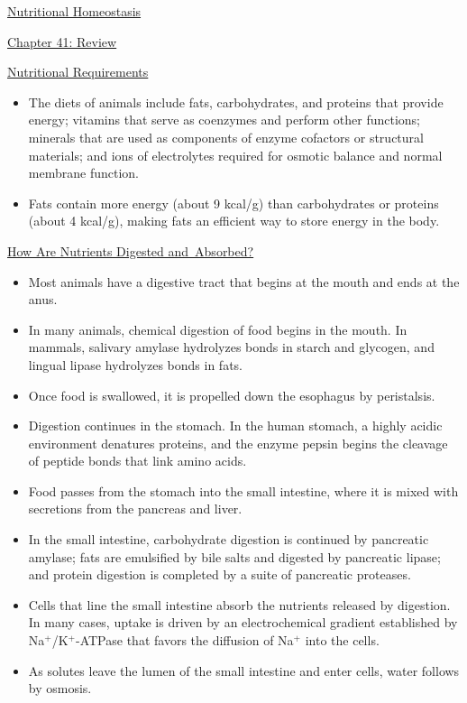 \documentclass[12pt,letterpaper]{article}
\begin{document}
\begin{secbox}{\hyperlink{41}{Nutritional Homeostasis}}
{\hypertarget{41.r}{}
\begin{probbox}{\hyperlink{41}{Chapter 41: Review}}\end{probbox}
    \hyperlink{41.1}{Nutritional Requirements}
    \begin{itemize}
        \item The diets of animals include fats, carbohydrates, and proteins that provide energy; vitamins that serve as coenzymes and perform other functions; minerals that are used as components of enzyme cofactors or structural materials; and ions of electrolytes required for osmotic balance and normal membrane function. 
        \item Fats contain more energy (about 9 kcal/g) than carbohydrates or proteins (about 4 kcal/g), making fats an efficient way to store energy in the body.
    \end{itemize}
    \hyperlink{41.3}{How Are Nutrients Digested and Absorbed?}
    \begin{itemize}
        \item Most animals have a digestive tract that begins at the mouth and ends at the anus. 
        \item In many animals, chemical digestion of food begins in the mouth. In mammals, salivary amylase hydrolyzes bonds in starch and glycogen, and lingual lipase hydrolyzes bonds in fats. 
        \item Once food is swallowed, it is propelled down the esophagus by peristalsis. 
        \item Digestion continues in the stomach. In the human stomach, a highly acidic environment denatures proteins, and the enzyme pepsin begins the cleavage of peptide bonds that link amino acids. 
        \item Food passes from the stomach into the small intestine, where it is mixed with secretions from the pancreas and liver. 
        \item In the small intestine, carbohydrate digestion is continued by pancreatic amylase; fats are emulsified by bile salts and digested by pancreatic lipase; and protein digestion is completed by a suite of pancreatic proteases. 
        \item Cells that line the small intestine absorb the nutrients released by digestion. In many cases, uptake is driven by an electrochemical gradient established by Na\(^+\)/K\(^+\)-ATPase that favors the diffusion of Na\(^+\) into the cells. 
        \item As solutes leave the lumen of the small intestine and enter cells, water follows by osmosis. 

\end{itemize}}
\end{secbox}
\end{document}
